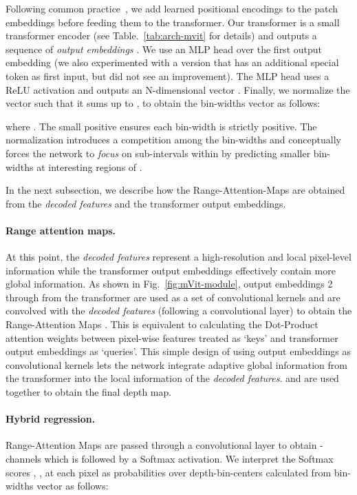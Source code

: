 \documentclass[final]{cvpr}
\begin{document}
Following common practice~\cite{detr2020,dosovitskiy2020}, we add learned positional encodings to the patch embeddings before feeding them to the transformer. Our transformer is a small transformer encoder (see Table.~\ref{tab:arch-mvit} for details) and outputs a sequence of \textit{output embeddings} . We use an MLP head over the first output embedding (we also experimented with a version that has an additional special token as first input, but did not see an improvement). The MLP head uses a ReLU activation and outputs an N-dimensional vector . Finally, we normalize the vector  such that it sums up to , to obtain the bin-widths vector  as follows:

where . The small positive  ensures each bin-width is strictly positive. The normalization introduces a competition among the bin-widths and conceptually forces the network to \textit{focus} on sub-intervals within  by predicting smaller bin-widths at interesting regions of . 

In the next subsection, we describe how the Range-Attention-Maps  are obtained from the \textit{decoded features} and the transformer output embeddings.

\paragraph{Range attention maps.} At this point, the \textit{decoded features} represent a high-resolution and local pixel-level information while the transformer output embeddings effectively contain more global information. As shown in Fig.~\ref{fig:mVit-module}, output embeddings 2 through  from the transformer are used as a set of  convolutional kernels and are convolved with the \textit{decoded features} (following a  convolutional layer) to obtain the Range-Attention Maps . This is equivalent to calculating the Dot-Product attention weights between pixel-wise features treated as `keys' and transformer output embeddings as `queries'. This simple design of using output embeddings as convolutional kernels lets the network integrate adaptive global information from the transformer into the local information of the \textit{decoded features}.  and  are used together to obtain the final depth map.

\paragraph{Hybrid regression.} Range-Attention Maps  are passed through a  convolutional layer to obtain -channels which is followed by a Softmax activation. We interpret the  Softmax scores , , at each pixel as probabilities over  depth-bin-centers 
calculated from bin-widths vector  as follows:
\end{document}
